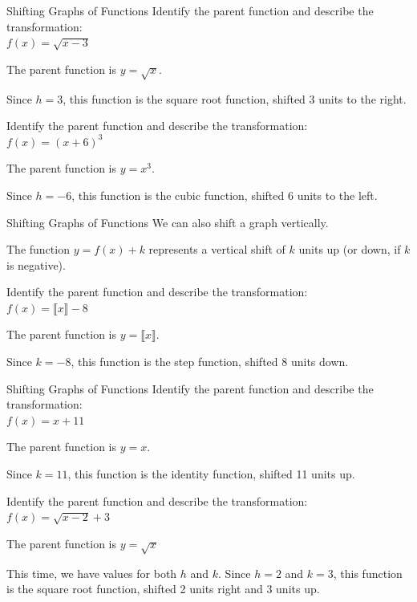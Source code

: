 \documentclass{beamer}
\begin{document}
\begin{frame}[t]{Shifting Graphs of Functions}
Identify the parent function and describe the transformation: \\
$f(x) = \sqrt{x - 3}$

\pause

The parent function is $y = \sqrt{x}$.

\pause

Since $h = 3$, this function is the square root function, shifted 3 units to the right. \vspace{18pt}

\pause

Identify the parent function and describe the transformation: \\
$f(x) = (x+6)^3$

\pause

The parent function is $y = x^3$.

\pause

Since $h = -6$, this function is the cubic function, shifted 6 units to the left.
\end{frame}

\begin{frame}[t]{Shifting Graphs of Functions}
We can also shift a graph vertically.

The function $y = f(x) + k$ represents a vertical shift of $k$ units up (or down, if $k$ is negative). \vspace{12pt}

\pause

Identify the parent function and describe the transformation: \\
$f(x) = \llbracket x \rrbracket - 8$

\pause

The parent function is $y = \llbracket x \rrbracket$.

\pause

Since $k = -8$, this function is the step function, shifted 8 units down. 
\end{frame}

\begin{frame}[t]{Shifting Graphs of Functions}
Identify the parent function and describe the transformation: \\
$f(x) = x + 11$

\pause

The parent function is $y = x$.

\pause

Since $k = 11$, this function is the identity function, shifted 11 units up. \vspace{18pt}

Identify the parent function and describe the transformation: \\
$f(x) = \sqrt{x - 2} + 3$

\pause

The parent function is $y = \sqrt{x}$

\pause

This time, we have values for both $h$ and $k$. Since $h = 2$ and $k = 3$, this function is the square root function, shifted 2 units right and 3 units up.
\end{frame}
\end{document}
